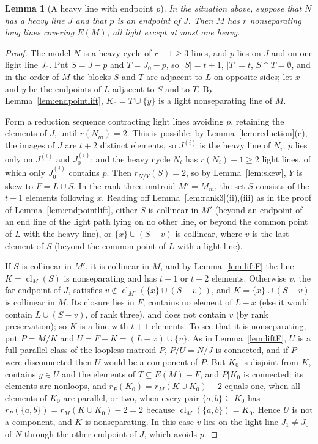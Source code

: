 \documentclass[11pt]{amsart}
\newtheorem{lemma}[theorem]{Lemma}
\theoremstyle{definition}
\theoremstyle{remark}
\numberwithin{equation}{section}
\newcommand{\cl}{\operatorname{cl}}
\begin{document}
\begin{lemma}[A heavy line with endpoint $p$]\label{lem:heavyendpoint}
In the situation above, suppose that $N$ has a heavy line $J$ and that $p$ is an endpoint of $J$. Then $M$ has $r$ nonseparating long lines covering $E(M)$, all light except at most one heavy.
\end{lemma}

\begin{proof}
The model $N$ is a heavy cycle of $r-1\ge3$ lines, and $p$ lies on $J$ and on one light line $J_0$. Put $S=J-p$ and $T=J_0-p$, so $|S|=t+1$, $|T|=t$, $S\cap T=\emptyset$, and in the order of $M$ the blocks $S$ and $T$ are adjacent to $L$ on opposite sides; let $x$ and $y$ be the endpoints of $L$ adjacent to $S$ and to $T$. By Lemma~\ref{lem:endpointlift}, $K_0=T\cup\{y\}$ is a light nonseparating line of $M$.

Form a reduction sequence contracting light lines avoiding $p$, retaining the elements of $J$, until $r(N_m)=2$. This is possible: by Lemma~\ref{lem:reduction}(c), the images of $J$ are $t+2$ distinct elements, so $J^{(i)}$ is the heavy line of $N_i$; $p$ lies only on $J^{(i)}$ and $J_0^{(i)}$; and the heavy cycle $N_i$ has $r(N_i)-1\ge2$ light lines, of which only $J_0^{(i)}$ contains $p$. Then $r_{N/Y}(S)=2$, so by Lemma~\ref{lem:skew}, $Y$ is skew to $F=L\cup S$. In the rank-three matroid $M'=M_m$, the set $S$ consists of the $t+1$ elements following $x$. Reading off Lemma~\ref{lem:rank3}(ii),(iii) as in the proof of Lemma~\ref{lem:endpointlift}, either $S$ is collinear in $M'$ (beyond an endpoint of an end line of the light path lying on no other line, or beyond the common point of $L$ with the heavy line), or $\{x\}\cup(S-v)$ is collinear, where $v$ is the last element of $S$ (beyond the common point of $L$ with a light line).

If $S$ is collinear in $M'$, it is collinear in $M$, and by Lemma~\ref{lem:liftF} the line $K=\cl_M(S)$ is nonseparating and has $t+1$ or $t+2$ elements. Otherwise $v$, the far endpoint of $J$, satisfies $v\notin\cl_{M'}(\{x\}\cup(S-v))$, and $K=\{x\}\cup(S-v)$ is collinear in $M$. Its closure lies in $F$, contains no element of $L-x$ (else it would contain $L\cup(S-v)$, of rank three), and does not contain $v$ (by rank preservation); so $K$ is a line with $t+1$ elements. To see that it is nonseparating, put $P=M/K$ and $U=F-K=(L-x)\cup\{v\}$. As in Lemma~\ref{lem:liftF}, $U$ is a full parallel class of the loopless matroid $P$, $P/U=N/J$ is connected, and if $P$ were disconnected then $U$ would be a component of $P$. But $K_0$ is disjoint from $K$, contains $y\in U$ and the elements of $T\subseteq E(M)-F$, and $P|K_0$ is connected: its elements are nonloops, and $r_P(K_0)=r_M(K\cup K_0)-2$ equals one, when all elements of $K_0$ are parallel, or two, when every pair $\{a,b\}\subseteq K_0$ has $r_P(\{a,b\})=r_M(K\cup K_0)-2=2$ because $\cl_M(\{a,b\})=K_0$. Hence $U$ is not a component, and $K$ is nonseparating. In this case $v$ lies on the light line $J_1\ne J_0$ of $N$ through the other endpoint of $J$, which avoids $p$.


\end{proof}
\end{document}
